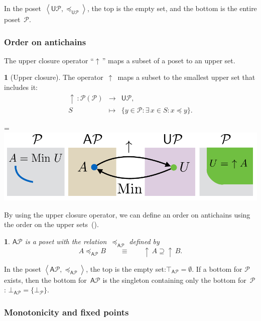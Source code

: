 \documentclass[twocolumn,english]{IEEEtran}
\theoremstyle{definition}
\newtheorem{defn}{\protect\definitionname}
\theoremstyle{plain}
\newtheorem{lem}{\protect\lemmaname}
\theoremstyle{definition}
\theoremstyle{remark}
\theoremstyle{definition}
\theoremstyle{plain}
\theoremstyle{plain}
\newcommand{\aword}[1]{\mathsf{#1}}
\newcommand{\vmath}[1]{\aword{#1}}
\newcommand{\pset}{\mathscr{P}}
\newcommand{\posleq}{\preceq}
\newcommand{\posA}{\mathcal{P}}
\newcommand{\antichains}{\vmath{A}}
\newcommand{\upsets}{\vmath{U}}
\newcommand{\upit}{{\uparrow\,}}
\newcommand*{\vcenteredhbox}[1]{\begingroup
\setbox0=\hbox{#1}\parbox{\wd0}{\box0}\endgroup}
\newcommand{\captionsideleft}[2]{
    \medskip
    \begin{minipage}{1.8cm}{
        \hfill
        \protect\captionof{figure}{#1}}\end{minipage}
    \begin{minipage}{6.6cm}
    
    \vcenteredhbox{{#2}}
    \hfill
    \end{minipage}
    \medskip
}
\providecommand{\definitionname}{Definition}
\providecommand{\lemmaname}{Lemma}
\begin{document}
In the poset~$\left\langle \upsets\posA,\posleq_{\upsets\posA}\right\rangle $,
the top is the empty set, and the bottom is the entire poset~$\posA$.


\subsubsection*{Order on antichains}

The upper closure operator ``$\upit$'' maps a subset of a poset
to an upper set.
\begin{defn}[Upper closure]
The operator~$\upit$ maps a subset to the smallest upper set that
includes it: 
\begin{eqnarray*}
\upit\colon\pset(\posA) & \rightarrow & \upsets\posA,\\
S & \mapsto & \{y\in\posA:\exists\,x\in S:x\posleq y\}.
\end{eqnarray*}
\end{defn}

\captionsideleft{\label{fig:antichains_upsets}}{\includegraphics[scale=0.4]{gmcdp_antichains_upsets}}

By using the upper closure operator, we can define an order on antichains
using the order on the upper sets~().
\begin{lem}
\label{lem:antichains-are-poset}$\antichains\posA$ is a poset with
the relation~$\posleq_{\antichains\posA}$ defined by
\[
A\posleq_{\antichains\posA}B\qquad\equiv\qquad\upit A\supseteq\upit B.
\]
\end{lem}
In the poset $\left\langle \antichains\posA,\posleq_{\antichains\posA}\right\rangle $,
the top is the empty set:$\top_{\antichains\posA}=\emptyset.$ If
a bottom for $\posA$ exists, then the bottom for~$\antichains\posA$
is the singleton containing only the bottom for~$\posA$: $\bot_{\antichains\posA}=\{\bot_{\posA}\}.$


\subsubsection*{Monotonicity and fixed points\label{sec:Monotonicity-and-fixed}}
\end{document}
